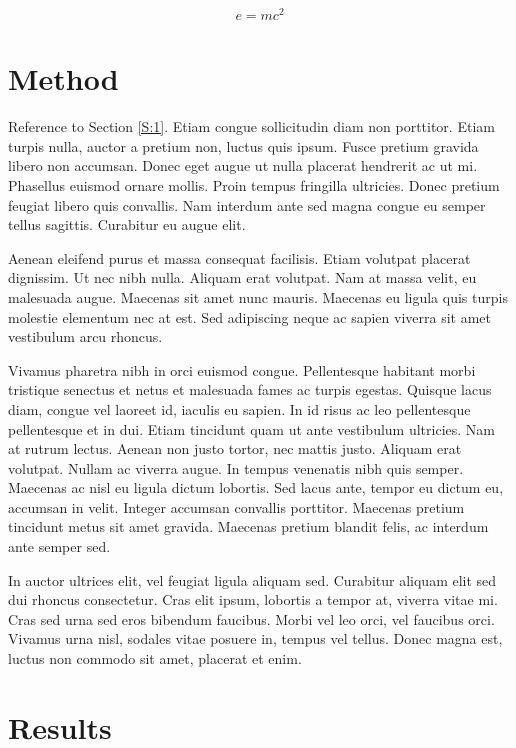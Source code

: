 \documentclass[preprint,12pt]{elsarticle}
\begin{document}
\begin{equation}
\label{eq:emc}
e = mc^2
\end{equation}

\section{Method}
\label{S:2}

Reference to Section \ref{S:1}. Etiam congue sollicitudin diam non porttitor. Etiam turpis nulla, auctor a pretium non, luctus quis ipsum. Fusce pretium gravida libero non accumsan. Donec eget augue ut nulla placerat hendrerit ac ut mi. Phasellus euismod ornare mollis. Proin tempus fringilla ultricies. Donec pretium feugiat libero quis convallis. Nam interdum ante sed magna congue eu semper tellus sagittis. Curabitur eu augue elit.

Aenean eleifend purus et massa consequat facilisis. Etiam volutpat placerat dignissim. Ut nec nibh nulla. Aliquam erat volutpat. Nam at massa velit, eu malesuada augue. Maecenas sit amet nunc mauris. Maecenas eu ligula quis turpis molestie elementum nec at est. Sed adipiscing neque ac sapien viverra sit amet vestibulum arcu rhoncus.

Vivamus pharetra nibh in orci euismod congue. Pellentesque habitant morbi tristique senectus et netus et malesuada fames ac turpis egestas. Quisque lacus diam, congue vel laoreet id, iaculis eu sapien. In id risus ac leo pellentesque pellentesque et in dui. Etiam tincidunt quam ut ante vestibulum ultricies. Nam at rutrum lectus. Aenean non justo tortor, nec mattis justo. Aliquam erat volutpat. Nullam ac viverra augue. In tempus venenatis nibh quis semper. Maecenas ac nisl eu ligula dictum lobortis. Sed lacus ante, tempor eu dictum eu, accumsan in velit. Integer accumsan convallis porttitor. Maecenas pretium tincidunt metus sit amet gravida. Maecenas pretium blandit felis, ac interdum ante semper sed.

In auctor ultrices elit, vel feugiat ligula aliquam sed. Curabitur aliquam elit sed dui rhoncus consectetur. Cras elit ipsum, lobortis a tempor at, viverra vitae mi. Cras sed urna sed eros bibendum faucibus. Morbi vel leo orci, vel faucibus orci. Vivamus urna nisl, sodales vitae posuere in, tempus vel tellus. Donec magna est, luctus non commodo sit amet, placerat et enim.


\section{Results}
\label{S:3}
\end{document}
